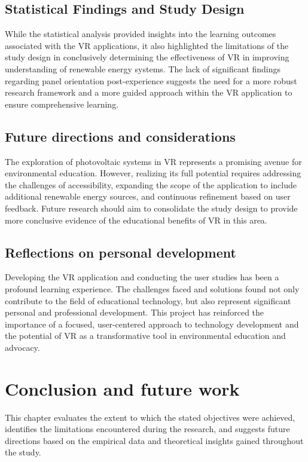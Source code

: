 \documentclass[draft, final]{vutinfth} %
\begin{document}
\section{Statistical Findings and Study Design}
While the statistical analysis provided insights into the learning outcomes associated with the VR applications, it also highlighted the limitations of the study design in conclusively determining the effectiveness of VR in improving understanding of renewable energy systems. The lack of significant findings regarding panel orientation post-experience suggests the need for a more robust research framework and a more guided approach within the VR application to ensure comprehensive learning.

\section{Future directions and considerations}
The exploration of photovoltaic systems in VR represents a promising avenue for environmental education. However, realizing its full potential requires addressing the challenges of accessibility, expanding the scope of the application to include additional renewable energy sources, and continuous refinement based on user feedback. Future research should aim to consolidate the study design to provide more conclusive evidence of the educational benefits of VR in this area.

\section{Reflections on personal development}
Developing the VR application and conducting the user studies has been a profound learning experience. The challenges faced and solutions found not only contribute to the field of educational technology, but also represent significant personal and professional development. This project has reinforced the importance of a focused, user-centered approach to technology development and the potential of VR as a transformative tool in environmental education and advocacy.

\chapter{Conclusion and future work}
This chapter evaluates the extent to which the stated objectives were achieved, identifies the limitations encountered during the research, and suggests future directions based on the empirical data and theoretical insights gained throughout the study.
\end{document}
